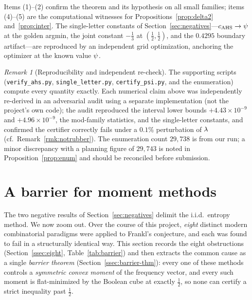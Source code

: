 \documentclass[11pt]{amsart}
\theoremstyle{definition}
\theoremstyle{remark}
\newtheorem{remark}[theorem]{Remark}
\begin{document}
Items (1)--(2) confirm the theorem and its hypothesis on all small families;
items (4)--(5) are the computational witnesses for Propositions~\ref{prop:delta2}
and~\ref{prop:inter}. The single-letter constants of
Section~\ref{sec:negatives}---$c_{\mathrm{AHS}}\to\psi$ at the golden argmin, the joint
constant $-\tfrac13$ at $(\tfrac12,\tfrac12)$, and the $0.4295$ boundary
artifact---are reproduced by an independent grid optimization, anchoring the
optimizer at the known value $\psi$.

\begin{remark}[Reproducibility and independent re-check]
The supporting scripts (\texttt{verify\_ahs.py}, \texttt{single\_letter.py},
\texttt{certify\_psi.py}, and the enumeration) compute every quantity exactly.
Each numerical claim above was independently re-derived in an adversarial audit
using a separate implementation (not the project's own code); the audit
reproduced the interval lower bounds $+4.43\times10^{-9}$ and $+4.96\times10^{-9}$,
the mod-family statistics, and the single-letter constants, and confirmed the
certifier correctly fails under a $0.1\%$ perturbation of $\lambda$ (cf.\
Remark~\ref{rmk:notrubber}). The enumeration count $29{,}738$ is from our run; a
minor discrepancy with a planning figure of $29{,}743$ is noted in
Proposition~\ref{prop:enum} and should be reconciled before submission.
\end{remark}

\section{A barrier for moment methods}
\label{sec:barrier}

The two negative results of Section~\ref{sec:negatives} delimit the i.i.d.\
entropy method. We now zoom out. Over the course of this project, \emph{eight}
distinct modern combinatorial paradigms were applied to Frankl's conjecture, and
each was found to fail in a structurally identical way. This section records the
eight obstructions (Section~\ref{ssec:eight}, Table~\ref{tab:barrier}) and then
extracts the common cause as a single \emph{barrier theorem}
(Section~\ref{ssec:barrier-thm}): every one of these methods controls a
\emph{symmetric convex moment} of the frequency vector, and every such moment is
flat-minimized by the Boolean cube at exactly $\tfrac12$, so none can certify a
strict inequality past $\tfrac12$.
\end{document}
